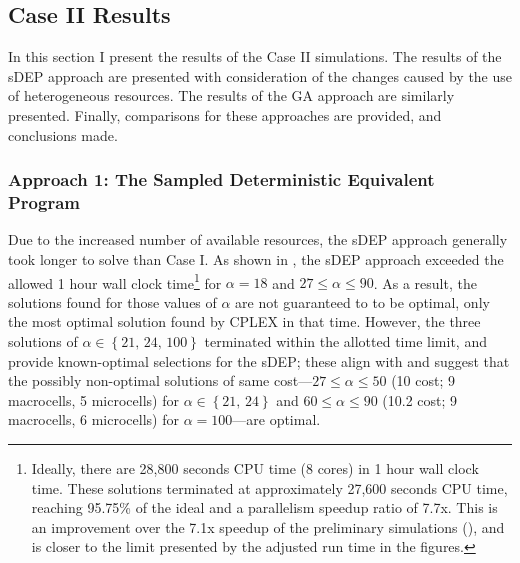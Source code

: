 \documentclass[12pt,dvipsnames]{report}
\begin{document}
\subsection{Case II Results} \label{subsec:caseII_results}

In this section I present the results of the Case II simulations.  The results of the sDEP approach are presented with consideration of the changes caused by the use of heterogeneous resources.  The results of the GA approach are similarly presented.  Finally, comparisons for these approaches are provided, and conclusions made.

\subsubsection{Approach 1: The Sampled Deterministic Equivalent Program}

Due to the increased number of available resources, the sDEP approach generally took longer to solve than Case I.  As shown in , the sDEP approach exceeded the allowed 1 hour wall clock time\footnote{Ideally, there are 28,800 seconds CPU time (8 cores) in 1 hour wall clock time.  These solutions terminated at approximately 27,600 seconds CPU time, reaching 95.75\% of the ideal and a parallelism speedup ratio of 7.7x.  This is an improvement over the 7.1x speedup of the preliminary simulations (), and is closer to the limit presented by the  adjusted run time in the figures.} for $\alpha = 18$ and $27 \leq \alpha \leq 90$.  As a result, the solutions found for those values of $\alpha$ are not guaranteed to to be optimal, only the most optimal solution found by CPLEX in that time.  However, the three solutions of $\alpha \in \left\{ 21,\, 24,\, 100 \right\}$ terminated within the allotted time limit, and provide known-optimal selections for the sDEP; these align with and suggest that the possibly non-optimal solutions of same cost---$27 \leq \alpha \leq 50$ (10 cost; 9 macrocells, 5 microcells) for $\alpha \in \left\{ 21,\, 24 \right\}$ and $60 \leq \alpha \leq 90$ (10.2 cost; 9 macrocells, 6 microcells) for $\alpha = 100$---are optimal.
\end{document}
